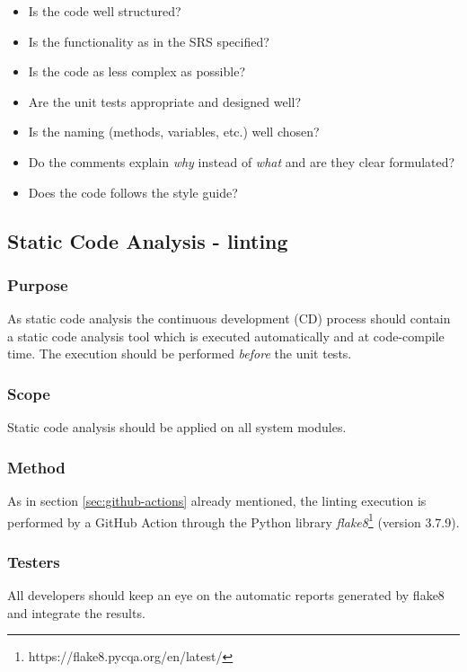 \documentclass[a4paper]{article}
\begin{document}
\begin{itemize}
    \item Is the code well structured?
    \item Is the functionality as in the SRS specified?
    \item Is the code as less complex as possible?
    \item Are the unit tests appropriate and designed well?
    \item Is the naming (methods, variables, etc.) well chosen?
    \item Do the comments explain \textit{why} instead of \textit{what} and are they clear formulated?
    \item Does the code follows the style guide?
\end{itemize}



 





\subsection{Static Code Analysis - linting}
\subsubsection*{Purpose}
As static code analysis the continuous development (CD) process should contain a static code analysis tool which is executed automatically and at code-compile time. The execution should be performed \textit{before} the unit tests. 

\subsubsection*{Scope}
Static code analysis should be applied on all system modules.

\subsubsection*{Method}
As in section \ref{sec:github-actions} already mentioned, the linting execution is performed by a GitHub Action through the Python library \textit{flake8}\footnote{https://flake8.pycqa.org/en/latest/} (version 3.7.9).

\subsubsection*{Testers}
All developers should keep an eye on the automatic reports generated by flake8 and integrate the results.
\end{document}
